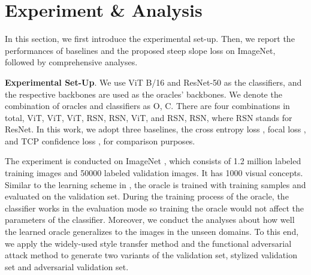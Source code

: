 \section{Experiment \& Analysis}
\label{sec:exp}
In this section, we first introduce the experimental set-up. Then, we report the performances of baselines and the proposed steep slope loss on ImageNet, followed by comprehensive analyses. 

\noindent\textbf{Experimental Set-Up}.
We use ViT B/16 \cite{Dosovitskiy_ICLR_2021} and ResNet-50 \cite{He_CVPR_2016} as the classifiers, and the respective backbones are used as the oracles' backbones. We denote the combination of oracles and classifiers as \textlangle O, C\textrangle. There are four combinations in total, \ie \textlangle ViT, ViT\textrangle, \textlangle ViT, RSN\textrangle, \textlangle RSN, ViT\textrangle, and \textlangle RSN, RSN\textrangle, where RSN stands for ResNet.
In this work, we adopt three baselines, \ie the cross entropy loss \cite{Cox_JRSS_1972}, focal loss \cite{Lin_ICCV_2017}, and TCP confidence loss \cite{Corbiere_NIPS_2019}, for comparison purposes.

The experiment is conducted on ImageNet \cite{Deng_CVPR_2009}, which consists of 1.2 million labeled training images and 50000 labeled validation images. It has 1000 visual concepts. Similar to the learning scheme in \cite{Corbiere_NIPS_2019}, the oracle is trained with training samples and evaluated on the validation set. During the training process of the oracle, the classifier works in the evaluation mode so training the oracle would not affect the parameters of the classifier. Moreover, we conduct the analyses about how well the learned oracle generalizes to the images in the unseen domains. To this end, we apply the widely-used style transfer method \cite{Geirhos_ICLR_2019} and the functional adversarial attack method \cite{Laidlaw_NeurIPS_2019} to generate two variants of the validation set, \ie stylized validation set and adversarial validation set. 


